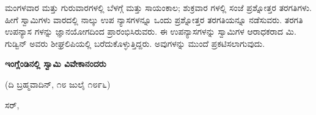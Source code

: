 ಮಂಗಳವಾರ ಮತ್ತು ಗುರುವಾರಗಳಲ್ಲಿ ಬೆಳಗ್ಗೆ ಮತ್ತು ಸಾಯಂಕಾಲ; ಶುಕ್ರವಾರ ಗಳಲ್ಲಿ ಸಂಜೆ ಪ್ರಶ್ನೋತ್ತರ ತರಗತಿಗಳು. ಹೀಗೆ ಸ್ವಾಮಿಗಳು ವಾರದಲ್ಲಿ ನಾಲ್ಕು ಉಪ ನ್ಯಾಸಗಳನ್ನೂ ಒಂದು ಪ್ರಶ್ನೋತ್ತರ ತರಗತಿಯನ್ನೂ ನಡೆಸುವರು. ತರಗತಿ ಉಪನ್ಯಾಸ ಗಳನ್ನು ಜ್ಞಾನಯೋಗದಿಂದ ಪ್ರಾರಂಭಿಸಿರುವರು. ಈ ಉಪನ್ಯಾಸಗಳನ್ನು ಸ್ವಾಮಿಗಳ ಆರಾಧಕರಾದ ಮಿ. ಗುಡ್ವಿನ್ ಅವರು ಶೀಘ್ರಲಿಪಿಯಲ್ಲಿ ಬರೆದುಕೊಳ್ಳುತ್ತಿದ್ದರು. ಅವುಗಳನ್ನು ಮುಂದೆ ಪ್ರಕಟಿಸಲಾಗುವುದು.

\begin{center}
\textbf{ಇಂಗ್ಲೆಂಡಿನಲ್ಲಿ ಸ್ವಾಮಿ ವಿವೇಕಾನಂದರು}
\end{center}

\begin{center}
(ದಿ ಬ್ರಹ್ಮವಾದಿನ್, ೧೮ ಜುಲೈ ೧೮೯೬)
\end{center}

ಸರ್,

